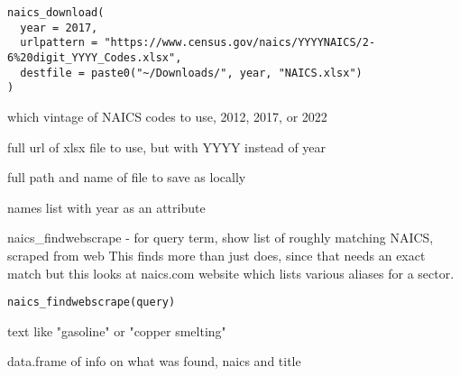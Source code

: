 \documentclass[a4paper]{book}
\begin{document}
%
\begin{Usage}
\begin{verbatim}
naics_download(
  year = 2017,
  urlpattern = "https://www.census.gov/naics/YYYYNAICS/2-6%20digit_YYYY_Codes.xlsx",
  destfile = paste0("~/Downloads/", year, "NAICS.xlsx")
)
\end{verbatim}
\end{Usage}
%
\begin{Arguments}
\begin{ldescription}
\item[\code{year}] which vintage of NAICS codes to use, 2012, 2017, or 2022

\item[\code{urlpattern}] full url of xlsx file to use, but with YYYY instead of year

\item[\code{destfile}] full path and name of file to save as locally
\end{ldescription}
\end{Arguments}
%
\begin{Value}
names list with year as an attribute
\end{Value}
%
\begin{Description}\relax
naics\_findwebscrape - for query term, show list of roughly matching NAICS, scraped from web
This finds more than just  does, since that needs an exact match
but this looks at naics.com website which lists various aliases for a sector.
\end{Description}
%
\begin{Usage}
\begin{verbatim}
naics_findwebscrape(query)
\end{verbatim}
\end{Usage}
%
\begin{Arguments}
\begin{ldescription}
\item[\code{query}] text like "gasoline" or "copper smelting"
\end{ldescription}
\end{Arguments}
%
\begin{Value}
data.frame of info on what was found, naics and title
\end{Value}
\end{document}
